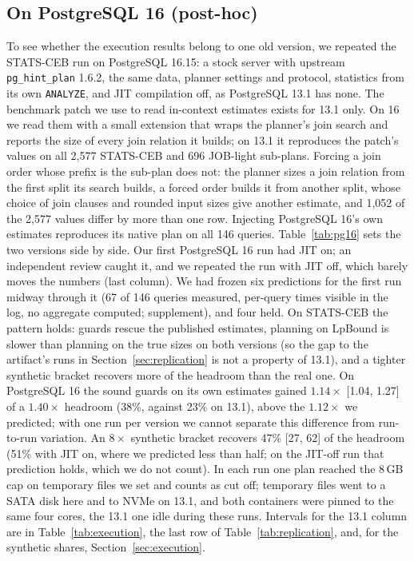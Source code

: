 \documentclass[sigconf, nonacm]{acmart}
\begin{document}
\subsection{On PostgreSQL 16 (post-hoc)}
\label{sec:pg16}
To see whether the execution results belong to one old version, we repeated
the STATS-CEB run on PostgreSQL 16.15: a stock server with upstream
\texttt{pg\_hint\_plan} 1.6.2, the same data, planner settings and protocol, statistics
from its own \texttt{ANALYZE}, and JIT compilation off, as PostgreSQL 13.1 has
none. The benchmark patch we use to read in-context estimates exists for 13.1
only. On 16 we read them with a small extension that wraps the planner's join
search and reports the size of every join relation it builds; on 13.1 it
reproduces the patch's values on all 2{,}577 STATS-CEB and 696 JOB-light
sub-plans. Forcing a join order whose prefix is the sub-plan does not: the
planner sizes a join relation from the first split its search builds, a forced
order builds it from another split, whose choice of join clauses and rounded
input sizes give another estimate, and 1{,}052 of the 2{,}577 values differ by
more than one row. Injecting PostgreSQL 16's own estimates reproduces its native
plan on all 146 queries. Table~\ref{tab:pg16} sets the two versions side by
side. Our first PostgreSQL 16 run had JIT on; an independent review caught it,
and we repeated the run with JIT off, which barely moves the numbers (last
column). We had frozen six predictions for the first run midway through it (67
of 146 queries measured, per-query times visible in the log, no aggregate
computed; supplement), and four held. On STATS-CEB the pattern holds: guards
rescue the published estimates, planning on LpBound is slower than planning on
the true sizes on both versions (so the gap to the artifact's runs in
Section~\ref{sec:replication} is not a property of 13.1), and a tighter
synthetic bracket recovers more of the headroom than the real one. On
PostgreSQL 16 the sound guards on its own estimates gained
$1.14\times$ [1.04, 1.27] of a $1.40\times$ headroom (38\%, against 23\% on
13.1), above the $1.12\times$ we predicted; with one run per version we cannot
separate this difference from run-to-run variation. An $8\times$ synthetic bracket
recovers 47\% [27, 62] of the headroom (51\% with JIT on, where we predicted
less than half; on the JIT-off run that prediction holds, which we do not
count). In each run one plan reached the 8\,GB cap on temporary files we set
and counts as cut off; temporary files went to a SATA disk here and to NVMe on
13.1, and both containers were pinned to the same four cores, the 13.1 one idle
during these runs. Intervals for the 13.1 column are in
Table~\ref{tab:execution}, the last row of Table~\ref{tab:replication}, and, for the
synthetic shares, Section~\ref{sec:execution}.
\end{document}
